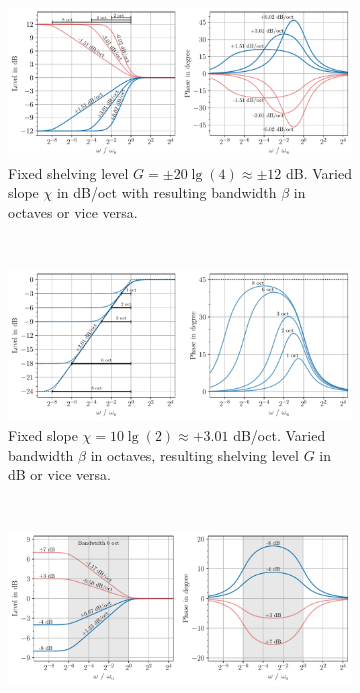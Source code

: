 \begin{figure}
\centering
\begin{subfigure}{0.8\textwidth}
\centering
\includegraphics[width=\textwidth]{../graphics/low-shelving-filter-varying-slope.pdf}
\caption{Fixed shelving level $G=\pm 20 \lg (4) \approx \pm 12$ dB.
Varied slope $\chi$ in
dB/oct with resulting bandwidth $\beta$ in octaves or vice versa.}
\label{fig:low-shelving-filter-varying-slope}
\end{subfigure}
\\
\begin{subfigure}{0.8\textwidth}
\centering
\includegraphics[width=\textwidth]{../graphics/low-shelving-filter-varying-bandwidth.pdf}
\caption{Fixed slope $\chi = 10\lg(2)\approx + 3.01$ dB/oct. Varied bandwidth
$\beta$ in octaves, resulting shelving level $G$ in dB or vice versa.}
\label{fig:low-shelving-filter-varying-bandwidth}
\end{subfigure}
\\
\begin{subfigure}{0.8\textwidth}
\centering
\includegraphics[width=\textwidth]{../graphics/low-shelving-filter-varying-gain.pdf}

\end{subfigure}
\end{figure}
